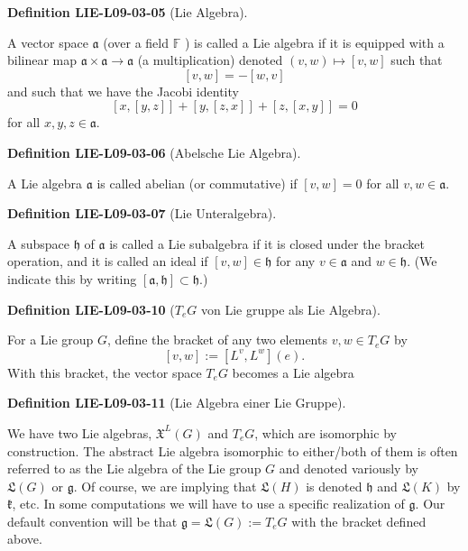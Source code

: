 \documentclass[10pt, letterpaper]{article}
\newcommand{\CustomHeading}[3]{%
  \par\medskip\noindent%
  \textbf{#1 #2} \textnormal{(#3)}.\enskip%
}
\newenvironment{DEF}[2]{\CustomHeading{Definition}{#1}{#2}}{}
\begin{document}
\begin{DEF}{LIE-L09-03-05}{Lie Algebra}
A vector space $\mathfrak{a}$ (over a field $\mathbb{F}$ ) is called a Lie algebra if it is equipped with a bilinear map $\mathfrak{a} \times \mathfrak{a} \rightarrow \mathfrak{a}$ (a multiplication) denoted $(v, w) \mapsto[v, w]$ such that
$$
[v, w]=-[w, v]
$$
and such that we have the Jacobi identity
$$
[x,[y, z]]+[y,[z, x]]+[z,[x, y]]=0
$$
for all $x, y, z \in \mathfrak{a}$.
\end{DEF}

\begin{DEF}{LIE-L09-03-06}{Abelsche Lie Algebra}
A Lie algebra $\mathfrak{a}$ is called abelian (or commutative) if $[v, w]=0$ for all $v, w \in \mathfrak{a}$.
\end{DEF}

\begin{DEF}{LIE-L09-03-07}{Lie Unteralgebra}
A subspace $\mathfrak{h}$ of $\mathfrak{a}$ is called a Lie subalgebra if it is closed under the bracket operation, and it is called an ideal if $[v, w] \in \mathfrak{h}$ for any $v \in \mathfrak{a}$ and $w \in \mathfrak{h}$. (We indicate this by writing $[\mathfrak{a}, \mathfrak{h}] \subset \mathfrak{h}$.)
\end{DEF}

\begin{DEF}{LIE-L09-03-10}{$T_eG$ von Lie gruppe als Lie Algebra}
For a Lie group $G$, define the bracket of any two elements $v, w \in T_{e} G$ by
$$
[v, w]:=\left[L^{v}, L^{w}\right](e) .
$$
With this bracket, the vector space $T_{e} G$ becomes a Lie algebra
\end{DEF}

\begin{DEF}{LIE-L09-03-11}{Lie Algebra einer Lie Gruppe}
We have two Lie algebras, $\mathfrak{X}^{L}(G)$ and $T_{e} G$, which are isomorphic by construction. The abstract Lie algebra isomorphic to either/both of them is often referred to as the Lie algebra of the Lie group $G$ and denoted variously by $\mathfrak{L}(G)$ or $\mathfrak{g}$. Of course, we are implying that $\mathfrak{L}(H)$ is denoted $\mathfrak{h}$ and $\mathfrak{L}(K)$ by $\mathfrak{k}$, etc. In some computations we will have to use a specific realization of $\mathfrak{g}$. Our default convention will be that $\mathfrak{g}=\mathfrak{L}(G):=T_{e} G$ with the bracket defined above.
\end{DEF}
\end{document}

